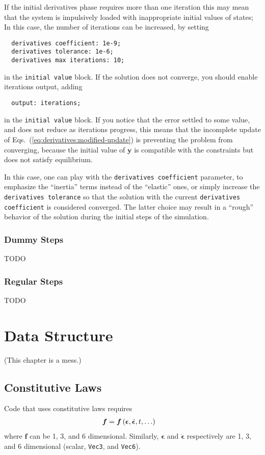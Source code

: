 \documentclass[10pt,dvips,fleqn,subeqn]{report}
\newcommand{\T}[1]{\bm{#1}}
\begin{document}
If the initial derivatives phase requires
more than one iteration  
this may mean that
the system is impulsively loaded  with inappropriate 
initial values of states; 
In this case, the number of iterations can be increased,
by setting
\begin{verbatim}
  derivatives coefficient: 1e-9;
  derivatives tolerance: 1e-6;
  derivatives max iterations: 10; 
\end{verbatim}
in the \texttt{initial value} block.
If the solution does not converge, you should enable iterations output,
adding
\begin{verbatim}
  output: iterations;
\end{verbatim}
in the \texttt{initial value} block.
If you notice that the error settled to some value, and does not reduce
as iterations progress, this means that the incomplete update
of Eqs.~(\ref{eq:derivatives:modified-update})
is preventing the problem from converging, because the initial value
of $\T{y}$ is compatible with the constraints
but does not satisfy equilibrium.

In this case, one can play with the \texttt{derivatives coefficient}
parameter, to emphasize the ``inertia'' terms instead of the ``elastic'' ones,
or simply increase the \texttt{derivatives tolerance} so that the solution
with the current \texttt{derivatives coefficient} is considered converged.
The latter choice may result in a ``rough'' behavior of the solution
during the initial steps of the simulation.



\subsection{Dummy Steps}
TODO

\subsection{Regular Steps}
TODO






\chapter{Data Structure}
(This chapter is a mess.)


\section{Constitutive Laws}
Code that uses constitutive laws requires
\begin{align}
	\T{f}
	&=
	\T{f}\plbr{ \T{\epsilon}, \dot{\T{\epsilon}}, t, \ldots }
\end{align}
where $\T{f}$ can be 1, 3, and 6 dimensional.
Similarly, $\T{\epsilon}$ and $\dot{\T{\epsilon}}$
respectively are 1, 3, and 6 dimensional
(scalar, \texttt{Vec3}, and \texttt{Vec6}).
\end{document}
